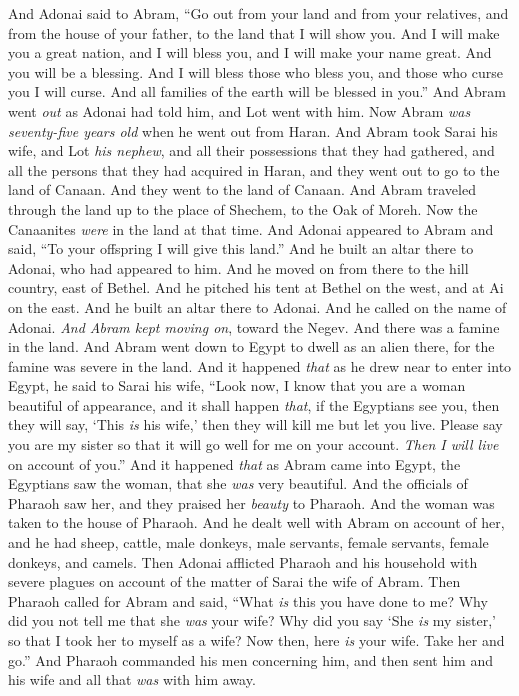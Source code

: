 \begin{biblechapter} %
 And Adonai said to Abram, “Go out from your land and from your relatives, and from the house of your father, to the land that I will show you.
\verse And I will make you a great nation, and I will bless you, and I will make your name great. And you will be a blessing.
\verse And I will bless those who bless you, and those who curse you I will curse. And all families of the earth will be blessed in you.”
 And Abram went \textit{out} as Adonai had told him, and Lot went with him. Now Abram \textit{was seventy-five years old} when he went out from Haran.
\verse And Abram took Sarai his wife, and Lot \textit{his nephew}, and all their possessions that they had gathered, and all the persons that they had acquired in Haran, and they went out to go to the land of Canaan. And they went to the land of Canaan.
\verse And Abram traveled through the land up to the place of Shechem, to the Oak of Moreh. Now the Canaanites \textit{were} in the land at that time.
\verse And Adonai appeared to Abram and said, “To your offspring I will give this land.” And he built an altar there to Adonai, who had appeared to him.
\verse And he moved on from there to the hill country, east of Bethel. And he pitched his tent at Bethel on the west, and at Ai on the east. And he built an altar there to Adonai. And he called on the name of Adonai.
\verse \textit{And Abram kept moving on}, toward the Negev.
\verse And there was a famine in the land. And Abram went down to Egypt to dwell as an alien there, for the famine was severe in the land.
\verse And it happened \textit{that} as he drew near to enter into Egypt, he said to Sarai his wife, “Look now, I know that you are a woman beautiful of appearance,
\verse and it shall happen \textit{that}, if the Egyptians see you, then they will say, ‘This \textit{is} his wife,’ then they will kill me but let you live.
\verse Please say you are my sister so that it will go well for me on your account. \textit{Then I will live} on account of you.”
\verse And it happened \textit{that} as Abram came into Egypt, the Egyptians saw the woman, that she \textit{was} very beautiful.
\verse And the officials of Pharaoh saw her, and they praised her \textit{beauty} to Pharaoh. And the woman was taken to the house of Pharaoh.
\verse And he dealt well with Abram on account of her, and he had sheep, cattle, male donkeys, male servants, female servants, female donkeys, and camels.
\verse Then Adonai afflicted Pharaoh and his household with severe plagues on account of the matter of Sarai the wife of Abram.
\verse Then Pharaoh called for Abram and said, “What \textit{is} this you have done to me? Why did you not tell me that she \textit{was} your wife?
\verse Why did you say ‘She \textit{is} my sister,’ so that I took her to myself as a wife? Now then, here \textit{is} your wife. Take her and go.”
\verse And Pharaoh commanded his men concerning him, and then sent him and his wife and all that \textit{was} with him away.
\end{biblechapter}

